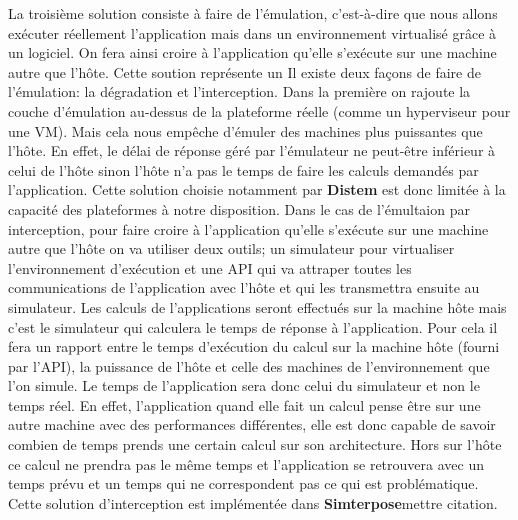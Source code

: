 La troisième solution consiste à faire de l'émulation, c'est-à-dire que nous allons exécuter réellement l'application mais dans un environnement virtualisé grâce à un logiciel. On fera ainsi croire à l'application qu'elle s'exécute sur une machine autre que l'hôte. Cette soution représente un Il existe deux façons de faire de l'émulation: la dégradation et l'interception. Dans la première on rajoute la couche d'émulation au-dessus de la plateforme réelle (comme un hyperviseur pour une VM). Mais cela nous empêche d'émuler des machines plus puissantes que l'hôte. En effet, le délai de réponse géré par l'émulateur ne peut-être inférieur à celui de l'hôte sinon l'hôte n'a pas le temps de faire les calculs demandés par l'application. Cette solution choisie notamment par \textbf{Distem}\cite{EMULATION:Distem} est donc limitée à la capacité des plateformes à notre disposition. Dans le cas de l'émultaion par interception, pour faire croire à l'application qu'elle s'exécute sur une machine autre que l'hôte on va utiliser deux outils; un simulateur pour virtualiser l'environnement d'exécution et une API qui va attraper toutes les communications de l'application avec l'hôte et qui les transmettra ensuite au simulateur. Les calculs de l'applications seront effectués sur la machine hôte mais c'est le simulateur qui calculera le temps de réponse à l'application. Pour cela il fera un rapport entre le temps d'exécution du calcul sur la machine hôte (fourni par l'API), la puissance de l'hôte et celle des machines de l'environnement que l'on simule. Le temps de l'application sera donc celui du simulateur et non le temps réel. En effet, l'application quand elle fait un calcul pense être sur une autre machine avec des performances différentes, elle est donc capable de savoir combien de temps prends une certain calcul sur son architecture. Hors sur l'hôte ce calcul ne prendra pas le même temps et l'application se retrouvera avec un temps prévu et un temps qui ne correspondent pas ce qui est problématique. Cette solution d'interception est implémentée dans \textbf{Simterpose}{\color{red}mettre citation}.



